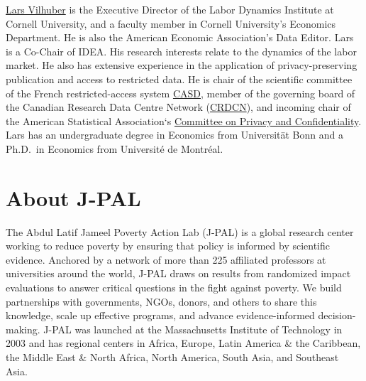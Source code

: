 \documentclass[11pt]{book}
\begin{document}
\href{https://www.vilhuber.com/lars/}{Lars Vilhuber} is the Executive
Director of the Labor Dynamics Institute at Cornell University, and a
faculty member in Cornell University's Economics Department. He is also
the American Economic Association's Data Editor. Lars is a Co-Chair of
IDEA. His research interests relate to the dynamics of the labor market.
He also has extensive experience in the application of
privacy-preserving publication and access to restricted data. He is
chair of the scientific committee of the French restricted-access system
\href{https://casd.eu}{CASD}, member of the governing board of the
Canadian Research Data Centre Network (\href{https://crdcn.org}{CRDCN}),
and incoming chair of the American Statistical Association`s
\href{https://community.amstat.org/cpc/home}{Committee on Privacy and
Confidentiality}. Lars has an undergraduate degree in Economics from
Universität Bonn and a Ph.D.~in Economics from Université de Montréal.

\section*{About J-PAL}\label{about-j-pal}
{}

The Abdul Latif Jameel Poverty Action Lab (J-PAL) is a global research
center working to reduce poverty by ensuring that policy is informed by
scientific evidence. Anchored by a network of more than 225 affiliated
professors at universities around the world, J-PAL draws on results from
randomized impact evaluations to answer critical questions in the fight
against poverty. We build partnerships with governments, NGOs, donors,
and others to share this knowledge, scale up effective programs, and
advance evidence-informed decision-making. J-PAL was launched at the
Massachusetts Institute of Technology in 2003 and has regional centers
in Africa, Europe, Latin America \& the Caribbean, the Middle East \&
North Africa, North America, South Asia, and Southeast Asia.






\mainmatter
\setcounter{page}{1}

\end{document}
